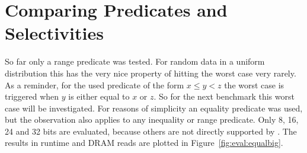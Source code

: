 \section{Comparing Predicates and Selectivities}

So far only a range predicate was tested. For random data in a uniform
distribution this has the very nice property of hitting the worst case very
rarely. As a reminder, for the used predicate of the form $x\le y < z$ the worst
case is triggered when $y$ is either equal to $x$ or $z$. So for the next
benchmark this worst case will be investigated. For reasons of simplicity an
equality predicate was used, but the observation also applies to any inequality
or range predicate. Only 8, 16, 24 and 32 bits are evaluated, because others are
not directly supported by \bs{}. The results in runtime and DRAM reads are
plotted in Figure~\ref{fig:eval:equalbig}.

